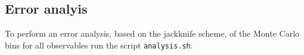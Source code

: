 \subsection{Error analyis}
To perform an error analysis, based on the jackknife scheme, of the Monte Carlo bins for all observables run the script \texttt{analysis.sh}.

 




